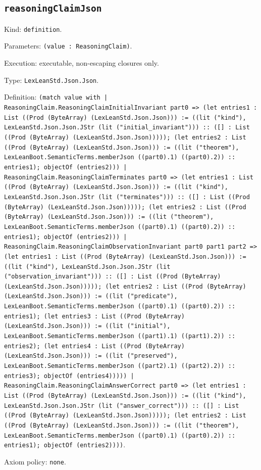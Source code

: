 \documentclass[11pt]{article}
\begin{document}
\subsection*{\texttt{reasoningClaimJson}}
\noindent Kind: \texttt{definition}.\par
\noindent Parameters: \texttt{(value : ReasoningClaim)}.\par
\noindent Execution: executable, non-escaping closures only.\par
\noindent Type: \texttt{LexLeanStd.Json.Json}.\par
\noindent Definition: \texttt{(match value with | ReasoningClaim.ReasoningClaimInitialInvariant part0 => (let entries1 : List ((Prod (ByteArray) (LexLeanStd.Json.Json))) := ((lit ("kind"), LexLeanStd.Json.Json.JStr (lit ("initial\_invariant"))) :: ([] : List ((Prod (ByteArray) (LexLeanStd.Json.Json))))); (let entries2 : List ((Prod (ByteArray) (LexLeanStd.Json.Json))) := ((lit ("theorem"), LexLeanBoot.SemanticTerms.memberJson ((part0).1) ((part0).2)) :: entries1); objectOf (entries2))) | ReasoningClaim.ReasoningClaimTerminates part0 => (let entries1 : List ((Prod (ByteArray) (LexLeanStd.Json.Json))) := ((lit ("kind"), LexLeanStd.Json.Json.JStr (lit ("terminates"))) :: ([] : List ((Prod (ByteArray) (LexLeanStd.Json.Json))))); (let entries2 : List ((Prod (ByteArray) (LexLeanStd.Json.Json))) := ((lit ("theorem"), LexLeanBoot.SemanticTerms.memberJson ((part0).1) ((part0).2)) :: entries1); objectOf (entries2))) | ReasoningClaim.ReasoningClaimObservationInvariant part0 part1 part2 => (let entries1 : List ((Prod (ByteArray) (LexLeanStd.Json.Json))) := ((lit ("kind"), LexLeanStd.Json.Json.JStr (lit ("observation\_invariant"))) :: ([] : List ((Prod (ByteArray) (LexLeanStd.Json.Json))))); (let entries2 : List ((Prod (ByteArray) (LexLeanStd.Json.Json))) := ((lit ("predicate"), LexLeanBoot.SemanticTerms.memberJson ((part0).1) ((part0).2)) :: entries1); (let entries3 : List ((Prod (ByteArray) (LexLeanStd.Json.Json))) := ((lit ("initial"), LexLeanBoot.SemanticTerms.memberJson ((part1).1) ((part1).2)) :: entries2); (let entries4 : List ((Prod (ByteArray) (LexLeanStd.Json.Json))) := ((lit ("preserved"), LexLeanBoot.SemanticTerms.memberJson ((part2).1) ((part2).2)) :: entries3); objectOf (entries4))))) | ReasoningClaim.ReasoningClaimAnswerCorrect part0 => (let entries1 : List ((Prod (ByteArray) (LexLeanStd.Json.Json))) := ((lit ("kind"), LexLeanStd.Json.Json.JStr (lit ("answer\_correct"))) :: ([] : List ((Prod (ByteArray) (LexLeanStd.Json.Json))))); (let entries2 : List ((Prod (ByteArray) (LexLeanStd.Json.Json))) := ((lit ("theorem"), LexLeanBoot.SemanticTerms.memberJson ((part0).1) ((part0).2)) :: entries1); objectOf (entries2))))}.\par
\noindent Axiom policy: \texttt{none}.\par
\end{document}
